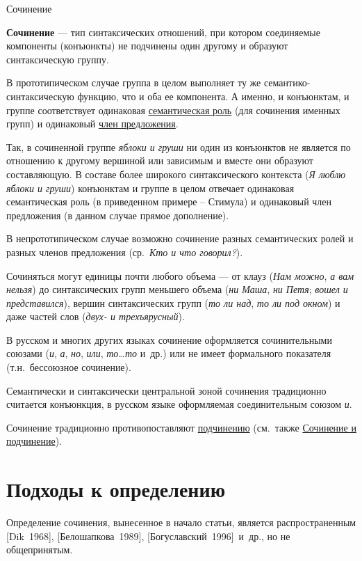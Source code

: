 Сочинение

\textbf{Сочинение} --- тип синтаксических отношений, при котором
соединяемые компоненты (конъюнкты) не подчинены один другому и образуют
синтаксическую группу.

В прототипическом случае группа в целом выполняет ту же
семантико-синтаксическую функцию, что и оба ее компонента. А именно, и
конъюнктам, и группе соответствует одинаковая \underline{семантическая
роль} (для сочинения именных групп) и одинаковый \underline{член
предложения}.

Так, в сочиненной группе \textit{яблоки и груши} ни один из конъюнктов не
является по отношению к другому вершиной или зависимым и вместе они
образуют составляющую. В составе более широкого синтаксического
контекста (\textit{Я люблю яблоки и груши}) конъюнктам и группе в целом
отвечает одинаковая семантическая роль (в приведенном примере --
Стимула) и одинаковый член предложения (в данном случае прямое
дополнение).

В непрототипическом случае возможно сочинение разных семантических ролей
и разных членов предложения (ср.~\textit{Кто и что говорил?}).

Сочиняться могут единицы почти любого объема --- от клауз (\textit{Нам
можно}, \textit{а вам нельзя}) до синтаксических групп меньшего объема
(\textit{ни Маша}, \textit{ни Петя}; \textit{вошел и представился}), вершин
синтаксических групп (\textit{то ли над}, \textit{то ли под окном}) и даже
частей слов (\textit{двух- и трехъярусный}).

В русском и многих других языках сочинение оформляется сочинительными
союзами (\textit{и}, \textit{а}, \textit{но}, \textit{или}, \textit{то\ldots то}
и~др.) или не имеет формального показателя (т.н.~бессоюзное сочинение).

Семантически и синтаксически центральной зоной сочинения традиционно
считается конъюнкция, в русском языке оформляемая соединительным союзом
\textit{и}.

Сочинение традиционно противопоставляют \underline{подчинению}
(см.~также \underline{Сочинение и подчинение}).

\tableofcontents

\section{Подходы к
определению}\label{ux43fux43eux434ux445ux43eux434ux44b-ux43a-ux43eux43fux440ux435ux434ux435ux43bux435ux43dux438ux44e}

Определение сочинения, вынесенное в начало статьи, является
распространенным {[}Dik~1968{]}, {[}Белошапкова~1989{]},
{[}Богуславский~1996{]}~и~др., но не общепринятым.

